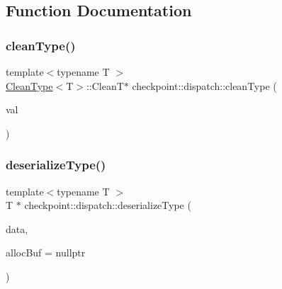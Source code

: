 \subsection{Function Documentation}
\mbox{\label{namespacecheckpoint_1_1dispatch_ad92e256ab5d87d2a5a97ed6ed011af9c}} 
\subsubsection{\texorpdfstring{clean\+Type()}{cleanType()}}
{\footnotesize\ttfamily template$<$typename T $>$ \\
\hyperlink{structcheckpoint_1_1dispatch_1_1_clean_type}{Clean\+Type}$<$T$>$\+::CleanT$\ast$ checkpoint\+::dispatch\+::clean\+Type (\begin{DoxyParamCaption}\item[{T $\ast$}]{val }\end{DoxyParamCaption})}

\mbox{\label{namespacecheckpoint_1_1dispatch_aa6898b55f6fb0de0b628567087cc8755}} 
\subsubsection{\texorpdfstring{deserialize\+Type()}{deserializeType()}\hspace{0.1cm}{\footnotesize\ttfamily [1/2]}}
{\footnotesize\ttfamily template$<$typename T $>$ \\
T $\ast$ checkpoint\+::dispatch\+::deserialize\+Type (\begin{DoxyParamCaption}\item[{\hyperlink{namespacecheckpoint_ae57f01cdc0b81776c23b6c7c934c58f5}{Serial\+Byte\+Type} $\ast$}]{data,  }\item[{\hyperlink{namespacecheckpoint_ae57f01cdc0b81776c23b6c7c934c58f5}{Serial\+Byte\+Type} $\ast$}]{alloc\+Buf = {\ttfamily nullptr} }\end{DoxyParamCaption})}

\mbox{\label{namespacecheckpoint_1_1dispatch_a1830f5dccc7209dc2bbb3b7ac238c36a}} 
